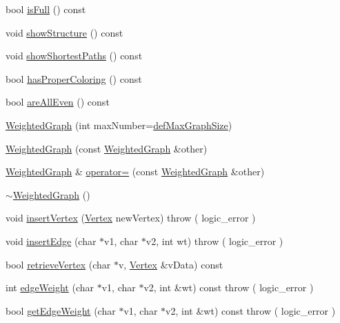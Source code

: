\begin{DoxyCompactItemize}
\item 
bool \hyperlink{class_weighted_graph_a22e56836e3967031a657cfa9ea5b9843}{is\-Full} () const 
\item 
void \hyperlink{class_weighted_graph_ad7f20a989073ea5401d504d944182347}{show\-Structure} () const 
\item 
void \hyperlink{class_weighted_graph_a91740718926ca2862726d297e7b28b7f}{show\-Shortest\-Paths} () const 
\item 
bool \hyperlink{class_weighted_graph_a60be8bab10a9142846093cb768855efd}{has\-Proper\-Coloring} () const 
\item 
bool \hyperlink{class_weighted_graph_a03884e32b9e093b10e3a44add7eaa928}{are\-All\-Even} () const 
\item 
\hyperlink{class_weighted_graph_acf8f5b4f212bc8daf4b12f0b88899180}{\-Weighted\-Graph} (int max\-Number=\hyperlink{_weighted_graph3_8h_a5a62135a2c33201a5b5d22eda348cbcb}{def\-Max\-Graph\-Size})
\item 
\hyperlink{class_weighted_graph_a294fd717db213e761dc0eb65bbfcb7ab}{\-Weighted\-Graph} (const \hyperlink{class_weighted_graph}{\-Weighted\-Graph} \&other)
\item 
\hyperlink{class_weighted_graph}{\-Weighted\-Graph} \& \hyperlink{class_weighted_graph_a32c3057c0f746f427068be4a9b408845}{operator=} (const \hyperlink{class_weighted_graph}{\-Weighted\-Graph} \&other)
\item 
\hyperlink{class_weighted_graph_ad7b4a5c8206772f9f4fb5906c0d64923}{$\sim$\-Weighted\-Graph} ()
\item 
void \hyperlink{class_weighted_graph_a164845f6fecf25a25f5f14f69d42d975}{insert\-Vertex} (\hyperlink{class_weighted_graph_1_1_vertex}{\-Vertex} new\-Vertex)  throw ( logic\-\_\-error )
\item 
void \hyperlink{class_weighted_graph_ad5e4bb96c2b3b5ace4be251bb3b47621}{insert\-Edge} (char $\ast$v1, char $\ast$v2, int wt)  throw ( logic\-\_\-error )
\item 
bool \hyperlink{class_weighted_graph_add447f0f2354c8c776045bf3bec865d8}{retrieve\-Vertex} (char $\ast$v, \hyperlink{class_weighted_graph_1_1_vertex}{\-Vertex} \&v\-Data) const 
\item 
int \hyperlink{class_weighted_graph_a80b2b095e7a05df4841383d2067e4345}{edge\-Weight} (char $\ast$v1, char $\ast$v2, int \&wt) const   throw ( logic\-\_\-error )
\item 
bool \hyperlink{class_weighted_graph_a0ff5197e169472040ab88b81049340d9}{get\-Edge\-Weight} (char $\ast$v1, char $\ast$v2, int \&wt) const   throw ( logic\-\_\-error )

\end{DoxyCompactItemize}
